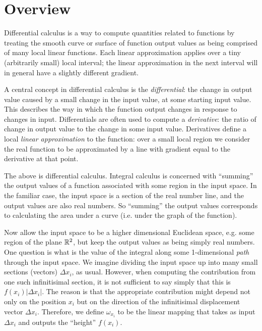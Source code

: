 \renewcommand{\ddx}{\frac{\d}{\dx}}

\section{Overview}
Differential calculus is a way to compute quantities related to functions by
treating the smooth curve or surface of function output values as being
comprised of many local linear functions. Each linear approximation applies
over a tiny (arbitrarily small) local interval; the linear approximation in the
next interval will in general have a slightly different gradient.

A central concept in differential calculus is the \textit{differential}: the
change in output value caused by a small change in the input value, at some
starting input value. This describes the way in which the function output
changes in response to changes in input. Differentials are often used to
compute a \textit{derivative}: the ratio of change in output value to the
change in some input value. Derivatives define a local \textit{linear
  approximation} to the function: over a small local region we consider the
real function to be approximated by a line with gradient equal to the
derivative at that point.

The above is differential calculus. Integral calculus is concerned with
``summing'' the output values of a function associated with some region in the
input space. In the familiar case, the input space is a section of the real
number line, and the output values are also real numbers. So ``summing'' the
output values corresponds to calculating the area under a curve (i.e. under the
graph of the function).

Now allow the input space to be a higher dimensional Euclidean space, e.g. some
region of the plane $\mathbb{R}^2$, but keep the output values as being simply real
numbers. One question is what is the value of the integral along some
1-dimensional \textit{path} through the input space. We imagine dividing the
input space up into many small sections (vectors) $\Delta x_i$, as
usual. However, when computing the contribution from one such infinitisimal
section, it is not sufficient to say simply that this is $f(x_i)|\Delta
x_i|$. The reason is that the appropriate contribution might depend not only on
the position $x_i$ but on the direction of the infinitisimal displacement
vector $\Delta x_i$. Therefore, we define $\omega_{x_i}$ to be the linear
mapping that takes as input $\Delta x_i$ and outputs the ``height'' $f(x_i)$.

